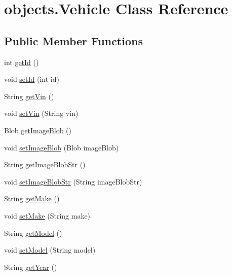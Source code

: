 \hypertarget{classobjects_1_1_vehicle}{}\section{objects.\+Vehicle Class Reference}
\label{classobjects_1_1_vehicle}
\subsection*{Public Member Functions}
\begin{DoxyCompactItemize}
\item 
int \mbox{\hyperlink{classobjects_1_1_vehicle_a8b8bcc1acba6a0665f76f4e13db10110}{get\+Id}} ()
\item 
void \mbox{\hyperlink{classobjects_1_1_vehicle_abcf1f2331d23fd4aec0012007f630f47}{set\+Id}} (int id)
\item 
String \mbox{\hyperlink{classobjects_1_1_vehicle_a477d9a6536cf3251fd8415df19634b4a}{get\+Vin}} ()
\item 
void \mbox{\hyperlink{classobjects_1_1_vehicle_a44f61da3a4c308d475240e8a33889651}{set\+Vin}} (String vin)
\item 
Blob \mbox{\hyperlink{classobjects_1_1_vehicle_a65b401d64cb83b83daf83c33919816c5}{get\+Image\+Blob}} ()
\item 
void \mbox{\hyperlink{classobjects_1_1_vehicle_ad0d4618125f8f685b635d0239c8106e8}{set\+Image\+Blob}} (Blob image\+Blob)
\item 
String \mbox{\hyperlink{classobjects_1_1_vehicle_af39b2e7837b4bac8dc55002dc1045e75}{get\+Image\+Blob\+Str}} ()
\item 
void \mbox{\hyperlink{classobjects_1_1_vehicle_a12f770c23ef3fe8fa8e019c27c1eb3a8}{set\+Image\+Blob\+Str}} (String image\+Blob\+Str)
\item 
String \mbox{\hyperlink{classobjects_1_1_vehicle_ada48ea9bb07ac065b9a4a0266f07e576}{get\+Make}} ()
\item 
void \mbox{\hyperlink{classobjects_1_1_vehicle_a42b62092af47c46a6a76ee809914d6ec}{set\+Make}} (String make)
\item 
String \mbox{\hyperlink{classobjects_1_1_vehicle_a1956a7b0b92454fa540af1ce0e2a0e41}{get\+Model}} ()
\item 
void \mbox{\hyperlink{classobjects_1_1_vehicle_a32a4aaf36a749654ef62934121f854b4}{set\+Model}} (String model)
\item 
String \mbox{\hyperlink{classobjects_1_1_vehicle_a0bc2ece5d4fd0087741111f6fd8ea3b8}{get\+Year}} ()
\item 

\end{DoxyCompactItemize}
